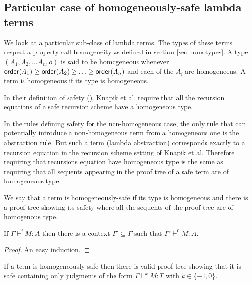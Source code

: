 
\subsection{Particular case of homogeneously-safe lambda terms}

We look at a particular sub-class of lambda terms. The types of
these terms respect a property call homogeneity as defined in
section \ref{sec:homotypes}. A type $(A_1, A_2, \ldots A_n, o)$ is
said to be homogeneous whenever ${\sf order}(A_1) \geq {\sf order}(A_2) \geq
\ldots \geq  {\sf order}(A_n)$ and each of the $A_i$ are homogeneous. A
term is homogeneous if its type is homogeneous.


In their definition of safety (\cite{KNU02}), Knapik et al. require
that all the recursion equations of a safe recursion scheme have a
homogeneous type.

In the rules defining safety for the non-homogeneous case, the only
rule that can potentially introduce a non-homogeneous term from a
homogeneous one is the abstraction rule. But such a term (lambda
abstraction) corresponds exactly to a recursion equation in the
recursion scheme setting of Knapik et al. Therefore requiring that
recursions equation have homogeneous type is the same as requiring
that all sequents appearing in the proof tree of a safe term are of
homogeneous type.

We say that a term is homogeneously-safe if its type is homogeneous
and there is a proof tree showing its safety where all the sequents
of the proof tree are of homogenous type.

\begin{lem}
\label{lem:context_reduction} If $\Gamma \vdash^i M : A$ then there
is a context $\Gamma' \subseteq \Gamma$ such that $\Gamma' \vdash^0
M : A$.
\end{lem}
\begin{proof}
An easy induction.
\end{proof}


\begin{lem}
\label{lem:homog_judg_zero_minusone} If a term is homogeneously-safe
then there is valid proof tree showing that it is safe containing
only judgments of the form $\Gamma \vdash^{k} M : T$ with $k\in
\{-1,0\}$.
\end{lem}

